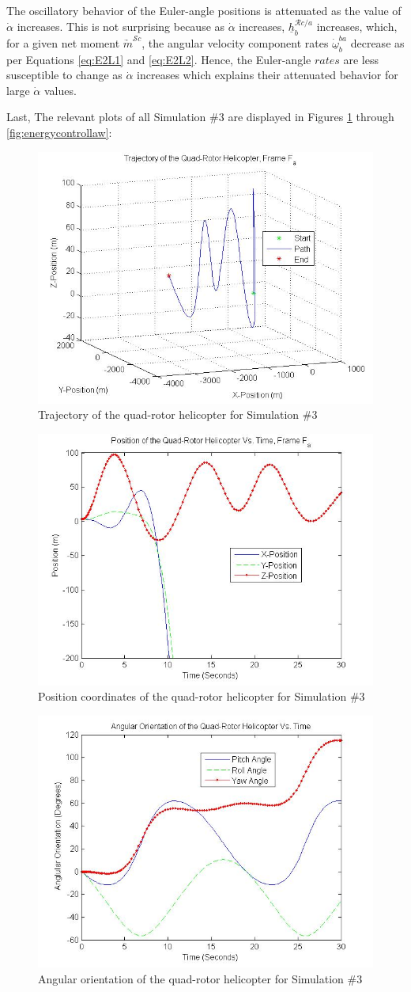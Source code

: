 \documentclass[journal]{IEEEtran}
\begin{document}
The oscillatory behavior of the Euler-angle positions is attenuated as the value of $\dot{\alpha}$ increases. This is not surprising because as $\dot{\alpha}$ increases, $\underline{h}^{\mathcal{R}c/a}_{b}$ increases, which, for a given net moment $\underrightarrow{m}^{\mathcal{S}c}$, the angular velocity component rates $\underline{\dot{\omega}}^{ba}_b$ decrease as per Equations \ref{eq:E2L1} and \ref{eq:E2L2}. Hence, the Euler-angle $rates$ are less susceptible to change as $\dot{\alpha}$ increases which explains their attenuated behavior for large $\dot{\alpha}$ values. 

\pagebreak
Last, The relevant plots of all Simulation $\#3$ are displayed in Figures \ref{fig:trajcontrollaw} through \ref{fig:energycontrollaw}:

\begin{figure}[ht!!!!]
    \centering
        \includegraphics[width=.30\textwidth]{trajcontrollaw}
    \caption{Trajectory of the quad-rotor helicopter for Simulation $\#3$}
    \label{fig:trajcontrollaw}
\end{figure}

\begin{figure}[ht!!!!]
    \centering
        \includegraphics[width=.30\textwidth]{poscontrollaw}
    \caption{Position coordinates of the quad-rotor helicopter for Simulation $\#3$}
    \label{fig:poscontrollaw}
\end{figure}

\begin{figure}[ht!!!!]
    \centering
        \includegraphics[width=.30\textwidth]{angoriencontrollaw}
    \caption{Angular orientation of the quad-rotor helicopter for Simulation $\#3$}
    \label{fig:angoriencontrollaw}
\end{figure}
\end{document}
